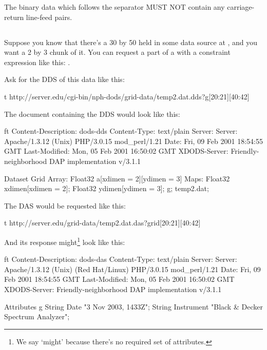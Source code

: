 \documentclass[justify]{nasa-ese}
\begin{document}
The binary data which follows the  separator MUST
NOT contain any carriage-return line-feed pairs.

\subsection{\Grid}

Suppose you know that there's a 30 by 50 \Grid held in some data source at
, and you want a 2 by 3 chunk of it. You can request a part of
a \Grid with a constraint expression like this: .


Ask for the DDS of this data like this:

\begin{vcode}{t}
http://server.edu/cgi-bin/nph-dods/grid-data/temp2.dat.dds?g[20:21][40:42]
\end{vcode}

The document containing the DDS would look like this:

\begin{vcode}{ft}
Content-Description: dods-dds
Content-Type: text/plain
Server: Server: Apache/1.3.12 (Unix)  PHP/3.0.15 mod_perl/1.21
Date: Fri, 09 Feb 2001 18:54:55 GMT
Last-Modified: Mon, 05 Feb 2001 16:50:02 GMT
XDODS-Server: Friendly-neighborhood DAP implementation v/3.1.1

Dataset {
  Grid {
    Array:
      Float32 a[xdimen = 2][ydimen = 3]
    Maps:
      Float32 xdimen[xdimen = 2];
      Float32 ydimen[ydimen = 3];
  } g;
} temp2.dat;
\end{vcode}

The DAS would be requested like this:

\begin{vcode}{t}
http://server.edu/grid-data/temp2.dat.das?grid[20:21][40:42]
\end{vcode}

And its response might\footnote{We say `might' because there's no
  required set of attributes.} look like this:

\begin{vcode}{ft}
Content-Description: dods-das
Content-Type: text/plain
Server: Server: Apache/1.3.12 (Unix)  (Red Hat/Linux) PHP/3.0.15 mod_perl/1.21
Date: Fri, 09 Feb 2001 18:54:55 GMT
Last-Modified: Mon, 05 Feb 2001 16:50:02 GMT
XDODS-Server: Friendly-neighborhood DAP implementation v/3.1.1

Attributes {
  g {
    String Date "3 Nov 2003, 1433Z";
    String Instrument "Black & Decker Spectrum Analyzer";
  }
}
\end{vcode}
\end{document}
